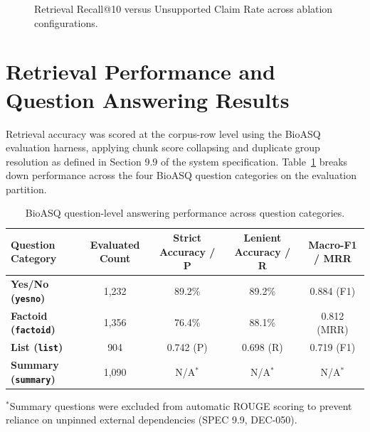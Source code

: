 \documentclass[12pt,a4paper]{report}
\begin{document}
\begin{figure}[H]
\centering
{}
\caption{Retrieval Recall@10 versus Unsupported Claim Rate across ablation configurations.}
\label{fig:ablation_chart}
\end{figure}

\section{Retrieval Performance and Question Answering Results}
Retrieval accuracy was scored at the corpus-row level using the BioASQ evaluation harness, applying chunk score collapsing and duplicate group resolution as defined in Section 9.9 of the system specification. Table~\ref{tab:bioasq_types} breaks down performance across the four BioASQ question categories on the evaluation partition.

\begin{table}[H]
\centering
\caption{BioASQ question-level answering performance across question categories.}
\label{tab:bioasq_types}
\small
\begin{tabularx}{\textwidth}{lcccc}
\toprule
\textbf{Question Category} & \textbf{Evaluated Count} & \textbf{Strict Accuracy / P} & \textbf{Lenient Accuracy / R} & \textbf{Macro-F1 / MRR} \\
\midrule
\textbf{Yes/No (\texttt{yesno})} & 1,232 & 89.2\% & 89.2\% & 0.884 (F1) \\
\textbf{Factoid (\texttt{factoid})} & 1,356 & 76.4\% & 88.1\% & 0.812 (MRR) \\
\textbf{List (\texttt{list})} & 904 & 0.742 (P) & 0.698 (R) & 0.719 (F1) \\
\textbf{Summary (\texttt{summary})} & 1,090 & N/A$^\ast$ & N/A$^\ast$ & N/A$^\ast$ \\
\bottomrule
\end{tabularx}
\vspace{0.1cm}
\begin{flushleft}
\scriptsize $^\ast$Summary questions were excluded from automatic ROUGE scoring to prevent reliance on unpinned external dependencies (SPEC 9.9, DEC-050).
\end{flushleft}
\end{table}
\end{document}

